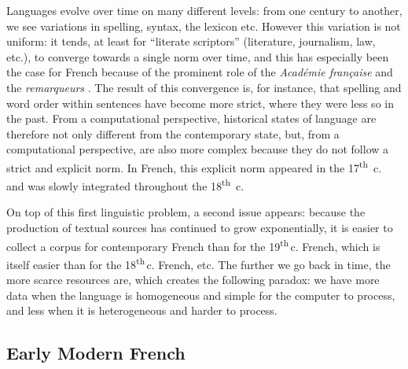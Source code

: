 Languages evolve over time on many different levels: from one century to another, we see variations in spelling, syntax, the lexicon etc. However this variation is not uniform: it tends, at least for ``literate scriptors'' (literature, journalism, law, etc.), to converge towards a single norm over time, and this has especially been the case for French because of the prominent role of the \emph{Académie française} and the \emph{remarqueurs} \cite{ayres-bennett-etal-2011-remarques}. The result of this convergence is, for instance, that spelling and word order within sentences have become more strict, where they were less so in the past. From a computational perspective, historical states of language are therefore not only different from the contemporary state, but, from a computational perspective, are also more complex because they do not follow a strict and explicit norm. In French, this explicit norm  appeared in the 17\textsuperscript{th}~c. and was slowly integrated throughout the 18\textsuperscript{th}~c.

On top of this first linguistic problem, a second issue appears: because the production of textual sources has continued to grow exponentially, it is easier to collect a corpus for contemporary French  than for the 19\textsuperscript{th}\,c. French, which is itself easier than for the 18\textsuperscript{th}\,c. French, etc. The further we go back in time, the more scarce resources are, which creates the following paradox: we have more data when the language is homogeneous and simple for the computer to process, and less when it is heterogeneous and harder to process.

\subsection{Early Modern French}\label{def:early}

